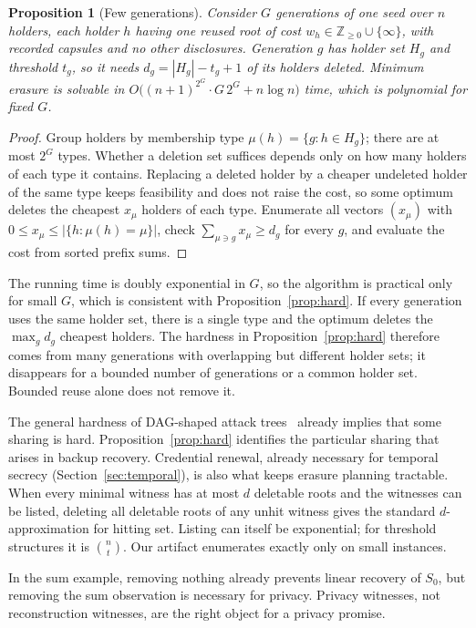 \documentclass[pdflatex,sn-mathphys-num,twocolumn]{sn-jnl}
\theoremstyle{plain}
\newtheorem{proposition}[theorem]{Proposition}
\theoremstyle{definition}
\begin{document}
\begin{proposition}[Few generations]\label{prop:fewgen}
Consider $G$ generations of one seed over $n$ holders, each holder $h$ having one reused root of cost $w_h\in\mathbb{Z}_{\ge0}\cup\{\infty\}$, with recorded capsules and no other disclosures. Generation $g$ has holder set $H_g$ and threshold $t_g$, so it needs $d_g=|H_g|-t_g+1$ of its holders deleted. Minimum erasure is solvable in $O\big((n+1)^{2^G}\cdot G\,2^G+n\log n\big)$ time, which is polynomial for fixed $G$.
\end{proposition}
\begin{proof}
Group holders by membership type $\mu(h)=\{g:h\in H_g\}$; there are at most $2^G$ types. Whether a deletion set suffices depends only on how many holders of each type it contains. Replacing a deleted holder by a cheaper undeleted holder of the same type keeps feasibility and does not raise the cost, so some optimum deletes the cheapest $x_\mu$ holders of each type. Enumerate all vectors $(x_\mu)$ with $0\le x_\mu\le|\{h:\mu(h)=\mu\}|$, check $\sum_{\mu\ni g}x_\mu\ge d_g$ for every $g$, and evaluate the cost from sorted prefix sums.
\end{proof}

The running time is doubly exponential in $G$, so the algorithm is practical only for small $G$, which is consistent with Proposition~\ref{prop:hard}. If every generation uses the same holder set, there is a single type and the optimum deletes the $\max_gd_g$ cheapest holders. The hardness in Proposition~\ref{prop:hard} therefore comes from many generations with overlapping but different holder sets; it disappears for a bounded number of generations or a common holder set. Bounded reuse alone does not remove it.

The general hardness of DAG-shaped attack trees~\cite{lopuhaa2022} already implies that some sharing is hard. Proposition~\ref{prop:hard} identifies the particular sharing that arises in backup recovery. Credential renewal, already necessary for temporal secrecy (Section~\ref{sec:temporal}), is also what keeps erasure planning tractable. When every minimal witness has at most $d$ deletable roots and the witnesses can be listed, deleting all deletable roots of any unhit witness gives the standard $d$-approximation for hitting set. Listing can itself be exponential; for threshold structures it is $\binom{n}{t}$. Our artifact enumerates exactly only on small instances.

In the sum example, removing nothing already prevents linear recovery of $S_0$, but removing the sum observation is necessary for privacy. Privacy witnesses, not reconstruction witnesses, are the right object for a privacy promise.
\end{document}
